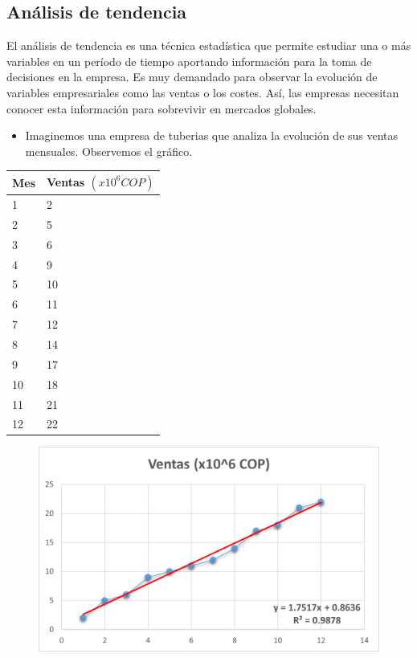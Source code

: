 \documentclass{article}
\theoremstyle{mytheoremstyle}
\theoremstyle{mytheoremstyle}
\theoremstyle{myproblemstyle}
\begin{document}
\begin{enumerate}
\section{Análisis de tendencia}


El análisis de tendencia es una técnica estadística que permite estudiar una o más variables en un período de tiempo aportando información para la toma de decisiones en la empresa.
Es muy demandado para observar la evolución de variables empresariales como las ventas o los costes. Así, las empresas necesitan conocer esta información para sobrevivir en mercados globales.
\begin{itemize}
	\item  Imaginemos una empresa de tuberias que analiza la evolución de sus ventas mensuales. Observemos el gráfico.
\end{itemize}
\begin{table}[H]
    \centering
    \begin{tabular}{|l|l|}
    \hline
        Mes & Ventas $(x10^{6}COP)$ \\ \hline
        1 & 2 \\ \hline
        2 & 5 \\ \hline
        3 & 6 \\ \hline
        4 & 9 \\ \hline
        5 & 10 \\ \hline
        6 & 11 \\ \hline
        7 & 12 \\ \hline
        8 & 14 \\ \hline
        9 & 17 \\ \hline
        10 & 18 \\ \hline
        11 & 21 \\ \hline
        12 & 22 \\ \hline
    \end{tabular}
\end{table}
\begin{figure}[H]
	\centering
	\includegraphics[width=\textwidth]{tendencia.png}

\end{figure}
\end{enumerate}
\end{document}
